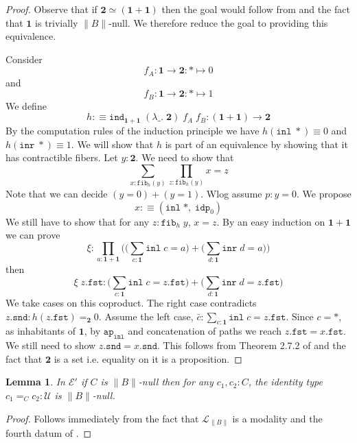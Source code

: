 \documentclass[12pt]{report}
\newtheorem{lem}[thm]{Lemma}
\theoremstyle{definition}
\begin{document}
\begin{proof}
Observe that if $\mathbf{2} \simeq (\mathbf{1} + \mathbf{1})$ then the goal would follow from  and the fact that $\mathbf{1}$ is trivially $\lVert B \rVert$-null. 
We therefore reduce the goal to providing this equivalence. 

Consider $$f_A : \mathbf{1} \rightarrow \mathbf{2} : * \mapsto 0$$
and 
$$f_B : \mathbf{1} \rightarrow \mathbf{2} : * \mapsto 1$$
We define
$$h :\equiv \mathtt{ind}_{\mathbf{1} + \mathbf{1}}\;(\lambda\_.\;\mathbf{2})\;f_A\;f_B : (\mathbf{1} + \mathbf{1}) \rightarrow \mathbf{2}$$
By the computation rules of the induction principle we have $h(\mathtt{inl}\; *) \equiv 0$ and $h(\mathtt{inr}\; *) \equiv 1$. 
We will show that $h$ is part of an equivalence by showing that it has contractible fibers. 
Let $y : \mathbf{2}$. 
We need to show that 
$$\sum_{x : \mathtt{fib}_h(y)}\prod_{z : \mathtt{fib}_h(y)}x = z$$
Note that we can decide $(y = 0) + (y = 1)$. 
Wlog assume $p : y = 0$. 
We propose 
$$x :\equiv (\mathtt{inl}\; *,\; \mathtt{idp}_0)$$
We still have to show that for any $z : \mathtt{fib}_h\; y$, $x = z$. 
By an easy induction on $\mathbf{1} + \mathbf{1}$ we can prove
$$\xi : \prod_{a: \mathbf{1} + \mathbf{1}} \Big(\big(\sum_{c : \mathbf{1}} \mathtt{inl}\; c = a\big) + \big( \sum_{d:\mathbf{1}} \mathtt{inr}\; d = a \big) \Big)$$
then
$$\xi\; z.\mathtt{fst} : \big(\sum_{c : \mathbf{1}} \mathtt{inl}\; c = z.\mathtt{fst}\big) + \big( \sum_{d:\mathbf{1}} \mathtt{inr}\; d = z.\mathtt{fst} \big)$$
We take cases on this coproduct. 
The right case contradicts $z.\mathtt{snd} : h(z.\mathtt{fst}) =_\mathbf{2} 0$. 
Assume the left case, $\bar{c} : \sum_{c : \mathbf{1}} \mathtt{inl}\; c = z.\mathtt{fst}$. 
Since $c = *$, as inhabitants of $\mathbf{1}$, by $\mathtt{ap}_\mathtt{inl}$ and concatenation of paths we reach $z.\mathtt{fst} = x.\mathtt{fst}$. 
We still need to show $z.\mathtt{snd} = x.\mathtt{snd}$. 
This follows from Theorem 2.7.2 of \cite{hottbook} and the fact that $\mathbf{2}$ is a set i.e. equality on it is a proposition. 
\end{proof}

\begin{lem}
In $\mathcal{E}'$ if $C$ is $\lVert B \rVert$-null then for any $c_1, c_2 : C$, the identity type $c_1=_C c_2 : \mathcal{U}$ is $\lVert B\rVert$-null. 
\end{lem}
\begin{proof}
Follows immediately from the fact that $\mathcal{L}_{\lVert B \rVert}$ is a modality and the fourth datum of .
\end{proof}
\end{document}
